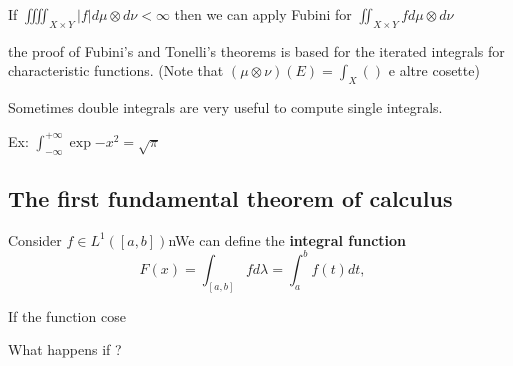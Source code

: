 If \(\iiiint_{X \times Y} \vert f \vert d\mu \otimes d\nu < \infty\) then we can apply Fubini for \(\iint_{X \times Y} f d\mu \otimes d\nu\)
\begin{remark}
    the proof of Fubini's and Tonelli's theorems is based for the iterated integrals for characteristic functions.
    (Note that \((\mu \otimes \nu)(E) = \int_X ()\) e altre cosette)
\end{remark}
\begin{remark}
    Sometimes double integrals are very useful to compute single integrals.
\end{remark}
Ex: \(\int_{-\infty}^{+\infty}\exp{-x^2} = \sqrt{\pi}\)


\subsection*{The first fundamental theorem of calculus}

Consider \(f \in L^1\left([a,b]\right)\)nWe can define the \textbf{integral function}
\[F(x) = \int_{[a,b]} f d\lambda = \int_a^b f(t)dt , \quad \]

If the function cose 

What happens if ?
